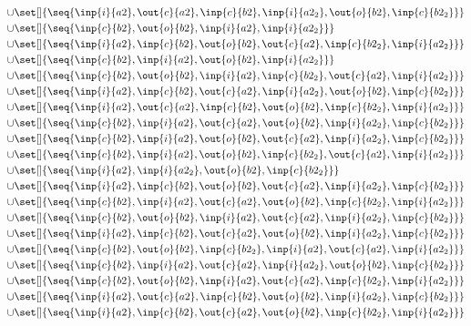 \begin{align*}
\cup&\set[]{\seq{\inp{i}{a2},\out{c}{a2},\inp{c}{b2},\inp{i}{a2_2},\out{o}{b2},\inp{c}{b2_2}}}\\
\cup&\set[]{\seq{\inp{c}{b2},\out{o}{b2},\inp{i}{a2},\inp{i}{a2_2}}}\\
\cup&\set[]{\seq{\inp{i}{a2},\inp{c}{b2},\out{o}{b2},\out{c}{a2},\inp{c}{b2_2},\inp{i}{a2_2}}}\\
\cup&\set[]{\seq{\inp{c}{b2},\inp{i}{a2},\out{o}{b2},\inp{i}{a2_2}}}\\
\cup&\set[]{\seq{\inp{c}{b2},\out{o}{b2},\inp{i}{a2},\inp{c}{b2_2},\out{c}{a2},\inp{i}{a2_2}}}\\
\cup&\set[]{\seq{\inp{i}{a2},\inp{c}{b2},\out{c}{a2},\inp{i}{a2_2},\out{o}{b2},\inp{c}{b2_2}}}\\
\cup&\set[]{\seq{\inp{i}{a2},\out{c}{a2},\inp{c}{b2},\out{o}{b2},\inp{c}{b2_2},\inp{i}{a2_2}}}\\
\cup&\set[]{\seq{\inp{c}{b2},\inp{i}{a2},\out{c}{a2},\out{o}{b2},\inp{i}{a2_2},\inp{c}{b2_2}}}\\
\cup&\set[]{\seq{\inp{c}{b2},\inp{i}{a2},\out{o}{b2},\out{c}{a2},\inp{i}{a2_2},\inp{c}{b2_2}}}\\
\cup&\set[]{\seq{\inp{c}{b2},\inp{i}{a2},\out{o}{b2},\inp{c}{b2_2},\out{c}{a2},\inp{i}{a2_2}}}\\
\cup&\set[]{\seq{\inp{i}{a2},\inp{i}{a2_2},\out{o}{b2},\inp{c}{b2_2}}}\\
\cup&\set[]{\seq{\inp{i}{a2},\inp{c}{b2},\out{o}{b2},\out{c}{a2},\inp{i}{a2_2},\inp{c}{b2_2}}}\\
\cup&\set[]{\seq{\inp{c}{b2},\inp{i}{a2},\out{c}{a2},\out{o}{b2},\inp{c}{b2_2},\inp{i}{a2_2}}}\\
\cup&\set[]{\seq{\inp{c}{b2},\out{o}{b2},\inp{i}{a2},\out{c}{a2},\inp{i}{a2_2},\inp{c}{b2_2}}}\\
\cup&\set[]{\seq{\inp{i}{a2},\inp{c}{b2},\out{c}{a2},\out{o}{b2},\inp{i}{a2_2},\inp{c}{b2_2}}}\\
\cup&\set[]{\seq{\inp{c}{b2},\out{o}{b2},\inp{c}{b2_2},\inp{i}{a2},\out{c}{a2},\inp{i}{a2_2}}}\\
\cup&\set[]{\seq{\inp{c}{b2},\inp{i}{a2},\out{c}{a2},\inp{i}{a2_2},\out{o}{b2},\inp{c}{b2_2}}}\\
\cup&\set[]{\seq{\inp{c}{b2},\out{o}{b2},\inp{i}{a2},\out{c}{a2},\inp{c}{b2_2},\inp{i}{a2_2}}}\\
\cup&\set[]{\seq{\inp{i}{a2},\out{c}{a2},\inp{c}{b2},\out{o}{b2},\inp{i}{a2_2},\inp{c}{b2_2}}}\\
\cup&\set[]{\seq{\inp{i}{a2},\inp{c}{b2},\out{c}{a2},\out{o}{b2},\inp{c}{b2_2},\inp{i}{a2_2}}}\\

\end{align*}
